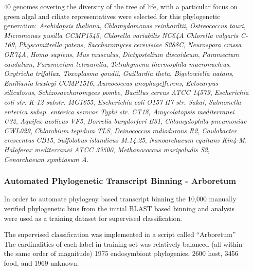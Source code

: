 40 genomes covering the diversity of the tree of life, with a particular focus on green algal and ciliate representatives 
were selected for this phylogenetic generation: 
\textit{Arabidopsis thaliana}, \textit{Chlamydomonas reinhardtii},
\textit{Ostreococcus tauri}, \textit{Micromonas pusilla CCMP1545},  \textit{Chlorella variabilis NC64A}
\textit{Chlorella vulgaris C-169}, \textit{Physcomitrella patens}, \textit{Saccharomyces cerevisiae S288C}, 
\textit{Neurospora crassa OR74A},
\textit{Homo sapiens},
\textit{Mus musculus},
\textit{Dictyostelium discoideum},
\textit{Paramecium caudatum},
\textit{Paramecium tetraurelia},
\textit{Tetrahymena thermophila macronucleus},
\textit{Oxytricha trifallax},
\textit{Toxoplasma gondii},
\textit{Guillardia theta},
\textit{Bigelowiella natans},
\textit{Emiliania huxleyi CCMP1516},
\textit{Aureococcus anophagefferens},
\textit{Ectocarpus siliculosus},
\textit{Schizosaccharomyces pombe},
\textit{Bacillus cereus ATCC 14579},
\textit{Escherichia coli str. K-12 substr. MG1655},
\textit{Escherichia coli O157 H7 str. Sakai},
\textit{Salmonella enterica subsp. enterica serovar Typhi str. CT18},
\textit{Amycolatopsis mediterranei U32},
\textit{Aquifex aeolicus VF5},
\textit{Borrelia burgdorferi B31},
\textit{Chlamydophila pneumoniae CWL029},
\textit{Chlorobium tepidum TLS},
\textit{Deinococcus radiodurans R2},
\textit{Caulobacter crescentus CB15},
\textit{Sulfolobus islandicus M.14.25},
\textit{Nanoarchaeum equitans Kin4-M},
\textit{Haloferax mediterranei ATCC 33500},
\textit{Methanococcus maripaludis S2},
\textit{Cenarchaeum symbiosum A}.

\subsubsection{Automated Phylogenetic Transcript Binning - Arboretum}
In order to automate phylogeny based transcript binning the 10,000
manually verified phylogenetic bins from the initial BLAST based binning
and analysis were used as a training dataset for supervised classification.

The supervised classification was implemented in a script called ``Arboretum''
The cardinalities of each label in training set was relatively balanced (all within
the same order of magnitude) 1975 endosymbiont phylogenies, 2600 host, 3456 food, and 1969
unknown. 

